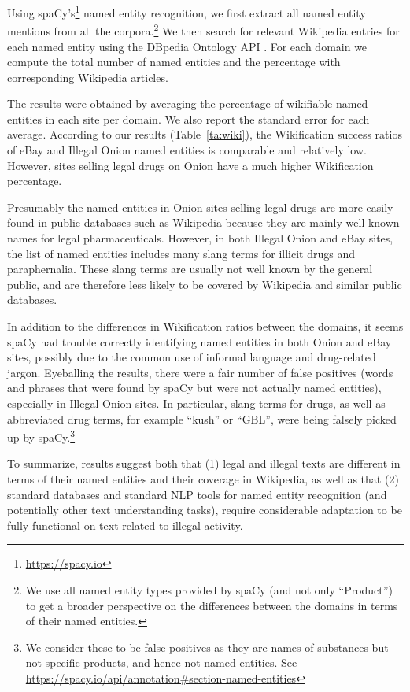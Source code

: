 \documentclass[11pt,a4paper,table]{article}
\begin{document}
    Using spaCy's\footnote{\url{https://spacy.io}}
    named entity recognition, we first extract all named
    entity mentions from all the corpora.\footnote{We use all named entity types provided by spaCy (and not only ``Product'') to get a broader perspective on the differences between the domains in terms of their named entities.} 
    We then search for relevant Wikipedia entries for each named entity using the DBpedia Ontology API \cite{isem2013daiber}.
    For each domain we compute the total number of named entities and the percentage with corresponding Wikipedia articles.

    The results were obtained by averaging the percentage of wikifiable named entities in each site per domain. We also report the standard error for each average.
    According to our results (Table~\ref{ta:wiki}), the Wikification success ratios of eBay and Illegal Onion named entities is comparable and relatively low. However, sites selling legal drugs on Onion have a much higher Wikification percentage.

Presumably the named entities in Onion sites selling legal drugs are
more easily found in public databases such as Wikipedia because they
are mainly well-known names for legal pharmaceuticals. However, in
both Illegal Onion and eBay sites, the list of named entities includes
many slang terms for illicit drugs and paraphernalia. These slang terms
are usually not well known by the general public, and are therefore
less likely to be covered by Wikipedia and similar public databases.


In addition to the differences in Wikification ratios between
the domains, it seems spaCy had trouble correctly identifying
named entities in both Onion and eBay sites, possibly
due to the common use of informal language and drug-related jargon.
Eyeballing the results, there were a fair number of false positives (words and phrases that were found by spaCy but were not actually named entities),
especially in Illegal Onion sites.
In particular, slang terms for drugs, as well as abbreviated drug terms, for example ``kush'' or ``GBL'',
were being falsely picked up by spaCy.\footnote{We
consider these to be false positives as they are names of substances but not specific products, 
and hence not named entities. See \url{https://spacy.io/api/annotation\#section-named-entities}}

To summarize, results suggest both that (1) legal and illegal texts are different in terms of their named entities and their coverage in Wikipedia, as well as that (2) standard databases and standard NLP tools for named entity recognition (and potentially other text understanding tasks), require considerable adaptation to be fully functional on text related to illegal activity.
\end{document}
